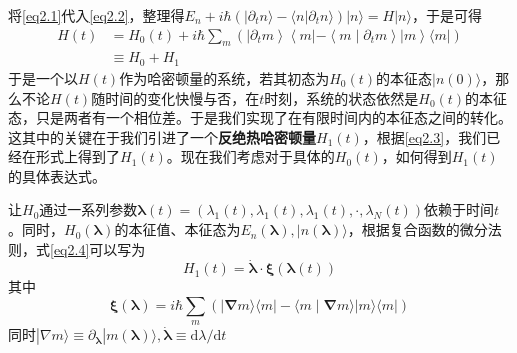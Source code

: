 将\ref{eq2.1}代入\ref{eq2.2}，整理得$ E_{n}+ i \hbar \left( | \partial_{t} n \rangle -\langle n | \partial_t n \rangle\right)|n\rangle=H| n\rangle$，于是可得
\begin{equation}
    \begin{split}
        H(t)&=H_{0}(t)+i \hbar \sum_{m}\left(\left|\partial_{t} m\right\rangle\left\langle m\left|-\left\langle m \mid \partial_{t} m\right\rangle\right| m\right\rangle\langle m|\right) \\
        &\equiv H_0 + H_1
    \end{split}
    \label{eq2.3}
\end{equation}
于是一个以$H (t)$作为哈密顿量的系统，若其初态为$H_0 (t)$的本征态$| n(0) \rangle$，那么不论$H (t)$随时间的变化快慢与否，在$t$时刻，系统的状态依然是$H_0 (t)$的本征态，只是两者有一个相位差。于是我们实现了在有限时间内的本征态之间的转化。这其中的关键在于我们引进了一个\textbf{反绝热哈密顿量}$H_1 (t)$，根据\ref{eq2.3}，我们已经在形式上得到了$H_1 (t)$。现在我们考虑对于具体的$H_0 (t)$，如何得到$H_1 (t)$的具体表达式。\cite{Jarzynski2013}

让$H_0$通过一系列参数$\bm{\lambda}(t)=\left( \lambda_1 (t) , \lambda_1 (t) , \lambda_1 (t) , \cdot , \lambda_{N} (t) \right)$依赖于时间$t$。同时，$H_0 (\bm{\lambda})$的本征值、本征态为$E_n (\bm{\lambda}), | n (\bm{\lambda}) \rangle$，根据复合函数的微分法则，式\ref{eq2.4}可以写为
\begin{equation}
    H_1 (t)=\dot{\boldsymbol{\lambda}} \cdot \boldsymbol{\xi}(\boldsymbol{\lambda}(t))
    \label{eq2.5}
\end{equation}
其中
\begin{equation}
    \boldsymbol{\xi}(\boldsymbol{\lambda})=i \hbar \sum_{m}(|\boldsymbol{\nabla} m\rangle\langle m|-\langle m \mid \boldsymbol{\nabla} m\rangle| m\rangle\langle m|)
    \label{eq2.4}
\end{equation}
同时$|\nabla m\rangle \equiv \partial_{\boldsymbol{\lambda}}|m(\boldsymbol{\lambda})\rangle  , \dot{\boldsymbol{\lambda}} \equiv \mathrm{d} \lambda / \mathrm{d} t$

